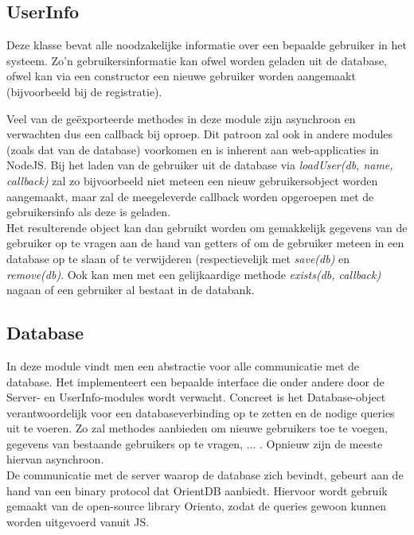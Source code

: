 \documentclass{article}
\begin{document}
\subsection{UserInfo}

Deze klasse bevat alle noodzakelijke informatie over een bepaalde gebruiker in het systeem. Zo'n gebruikersinformatie kan ofwel worden geladen uit de database, ofwel kan via een constructor een nieuwe gebruiker worden aangemaakt (bijvoorbeeld bij de registratie). 

Veel van de ge\"exporteerde methodes in deze module zijn asynchroon en verwachten dus een callback bij oproep. Dit patroon zal ook in andere modules (zoals dat van de database) voorkomen en is inherent aan web-applicaties in NodeJS. Bij het laden van de gebruiker uit de database via \textit{loadUser(db, name, callback)} zal zo bijvoorbeeld niet meteen een nieuw gebruikersobject worden aangemaakt, maar zal de meegeleverde callback worden opgeroepen met de gebruikersinfo als deze is geladen. \\

Het resulterende object kan dan gebruikt worden om gemakkelijk gegevens van de gebruiker op te vragen aan de hand van getters of om de gebruiker meteen in een database op te slaan of te verwijderen (respectievelijk met \textit{save(db)} en \textit{remove(db)}. Ook kan men met een gelijkaardige methode \textit{exists(db, callback)} nagaan of een gebruiker al bestaat in de databank.

\subsection{Database}

In deze module vindt men een abstractie voor alle communicatie met de database. Het implementeert een bepaalde interface die onder andere door de Server- en UserInfo-modules wordt verwacht. Concreet is het Database-object verantwoordelijk voor een databaseverbinding op te zetten en de nodige queries uit te voeren. Zo zal methodes aanbieden om nieuwe gebruikers toe te voegen, gegevens van bestaande gebruikers op te vragen, ... . Opnieuw zijn de meeste hiervan asynchroon. \\

De communicatie met de server waarop de database zich bevindt, gebeurt aan de hand van een binary protocol dat OrientDB aanbiedt. Hiervoor wordt gebruik gemaakt van de open-source library Oriento, zodat de queries gewoon kunnen worden uitgevoerd vanuit JS. 
\end{document}
